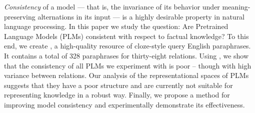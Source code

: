 
\textit{Consistency} of a model --- that is, the invariance
of its behavior under meaning-preserving alternations in its
input --- is a highly desirable property in natural language
processing.  In this paper we study the question: Are
Pretrained Language Models (PLMs) consistent with respect to
factual knowledge?  To this end, we create \resource{}, a
high-quality resource of cloze-style query English
paraphrases. It contains a total of 328 paraphrases for thirty-eight relations. Using \resource{}, we show that the consistency
of all PLMs we experiment with is poor -- though with high
variance between relations.  Our analysis of the
representational spaces of PLMs suggests that they have a
poor structure and are currently not suitable for
representing knowledge in a robust way.  Finally, we propose
a method for improving model consistency and experimentally
demonstrate its effectiveness.
